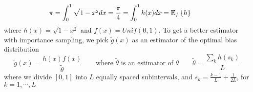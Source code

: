 \documentclass[11pt]{article}
\begin{document}
\begin{enumerate}
\begin{enumerate}
        \[
            \pi = \int_0^1 \sqrt{1-x^2} dx = \frac{\pi}{4}  
            = \int_0^1 h(x) dx = \E[f]{h}
            \qquad 
        \]
        where $h(x) = \sqrt{1-x^2}$ and $f(x) = Unif(0,1)$. To get a better estimator with importance sampling, we pick $\tilde{g}(x)$ as an estimator of the optimal bias distribution
        \[
            \tilde{g}(x) = \frac{h(x)f(x)}{\tilde{\theta}}
            \qquad 
            \text{where $\tilde{\theta}$ is an estimator of $\theta$}
            \qquad 
            \tilde{\theta} = \frac{\sum_k h(s_k)}{L}
        \]  
        where we divide $[0,1]$ into $L$ equally spaced subintervals, and $s_k = \textstyle \frac{k-1}{L} + \frac{1}{2L}$, for $k=1,\cdots, L$ 
    \end{enumerate}
\end{enumerate}
\end{document}
